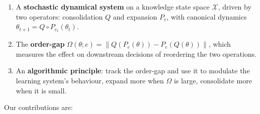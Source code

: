 \documentclass[12pt,a4paper]{article}
\newcommand{\X}{\mathcal{X}}
\newcommand{\norm}[1]{\left\lVert#1\right\rVert}
\newcommand{\Ogap}{\Omega}
\begin{document}
\begin{enumerate}
\item A \textbf{stochastic dynamical system} on a knowledge state space $\X$,
      driven by two operators: consolidation $Q$ and expansion $P_e$, with
      canonical dynamics $\theta_{t+1} = Q \circ P_{e_t}(\theta_t)$.

\item The \textbf{order-gap} $\Ogap(\theta; e) = \norm{Q(P_e(\theta)) -
      P_e(Q(\theta))}$, which measures the effect on downstream decisions of
      reordering the two operations.

\item An \textbf{algorithmic principle}: track the order-gap and use it to
      modulate the learning system's behaviour, expand more when $\Ogap$ is
      large, consolidate more when it is small.
\end{enumerate}

Our contributions are:
\end{document}
